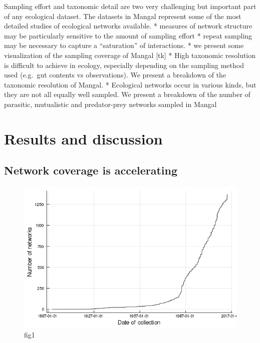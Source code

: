 Sampling effort and taxonomic detail are two very challenging but
important part of any ecological dataset. The datasets in Mangal
represent some of the most detailed studies of ecological networks
available. * measures of network structure may be particularly sensitive
to the amount of sampling effort * repeat sampling may be necessary to
capture a ``saturation'' of interactions. * we present some
visualization of the sampling coverage of Mangal {[}tk{]} * High
taxonomic resolution is difficult to achieve in ecology, especially
depending on the sampling method used (e.g.~gut contents vs
observations). We present a breakdown of the taxonomic resolution of
Mangal. * Ecological networks occur in various kinds, but they are not
all equally well sampled. We present a breakdown of the number of
parasitic, mutualistic and predator-prey networks sampled in Mangal

\hypertarget{results-and-discussion}{%
\section{Results and discussion}\label{results-and-discussion}}

\hypertarget{network-coverage-is-accelerating}{%
\subsection{Network coverage is
accelerating}\label{network-coverage-is-accelerating}}

\begin{figure}
\centering
\includegraphics{figures/figure_01_a.png}
\caption{fig1\label{fig:temporal}}
\end{figure}

